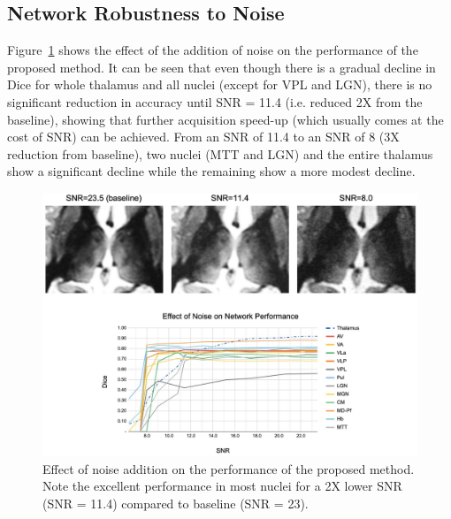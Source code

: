 \subsection{Network Robustness to Noise}Figure~\ref{f-136457b1c04a}  shows the effect of the addition of noise on the performance of the proposed method. It can be seen that even though there is a gradual decline in Dice for whole thalamus and all nuclei (except for VPL and LGN), there is no significant reduction in accuracy until SNR = 11.4 (i.e. reduced {\texttildeapprox} 2X from the baseline), showing that further acquisition speed-up (which usually comes at the cost of SNR) can be achieved. From an SNR of 11.4 to an SNR of 8 ({\texttildeapprox}3X reduction from baseline), two nuclei (MTT and LGN) and the entire thalamus show a significant decline while the remaining show a more modest decline.
\bgroup
{}
\begin{figure}[!htbp]
\centering \includegraphics{Thalamus/images/slide6.jpeg}
\makeatother 
\caption{Effect of noise addition on the performance of the proposed method. Note the excellent performance in most nuclei for a 2X lower SNR (SNR = 11.4) compared to baseline (SNR = 23).}
\label{f-136457b1c04a}
\end{figure}
\egroup


